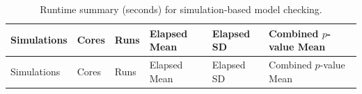 \documentclass[a4paper]{report}
\begin{document}
\begin{article}
\begin{longtable}[]{@{}
  >{\raggedleft\arraybackslash}p{}
  >{\raggedleft\arraybackslash}p{}
  >{\raggedleft\arraybackslash}p{}
  >{\raggedleft\arraybackslash}p{}
  >{\raggedleft\arraybackslash}p{}
  >{\raggedleft\arraybackslash}p{}@{}}
\caption{Runtime summary (seconds) for simulation-based model
checking.}\tabularnewline
\toprule\noalign{}
\begin{minipage}[b]{\linewidth}\raggedleft
Simulations
\end{minipage} & \begin{minipage}[b]{\linewidth}\raggedleft
Cores
\end{minipage} & \begin{minipage}[b]{\linewidth}\raggedleft
Runs
\end{minipage} & \begin{minipage}[b]{\linewidth}\raggedleft
Elapsed Mean
\end{minipage} & \begin{minipage}[b]{\linewidth}\raggedleft
Elapsed SD
\end{minipage} & \begin{minipage}[b]{\linewidth}\raggedleft
Combined \(p\)-value Mean
\end{minipage} \\
\midrule\noalign{}
\endfirsthead
\toprule\noalign{}
\begin{minipage}[b]{\linewidth}\raggedleft
Simulations
\end{minipage} & \begin{minipage}[b]{\linewidth}\raggedleft
Cores
\end{minipage} & \begin{minipage}[b]{\linewidth}\raggedleft
Runs
\end{minipage} & \begin{minipage}[b]{\linewidth}\raggedleft
Elapsed Mean
\end{minipage} & \begin{minipage}[b]{\linewidth}\raggedleft
Elapsed SD
\end{minipage} & \begin{minipage}[b]{\linewidth}\raggedleft
Combined \(p\)-value Mean
\end{minipage} \\

\end{longtable}
\end{article}
\end{document}
